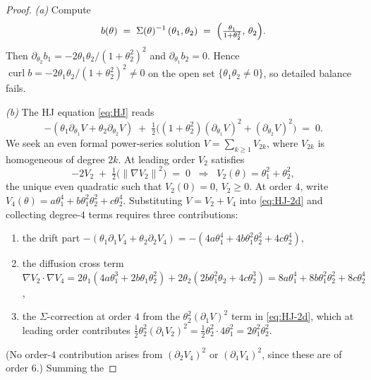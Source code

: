 \documentclass[11pt,a4paper]{article}
\theoremstyle{definition}
\theoremstyle{remark}
\DeclareMathOperator{\curl}{curl}
\newcommand{\norm}[1]{\left\|#1\right\|}
\begin{document}
\begin{proof}
   \emph{(a)}  Compute
   \[
      b(\theta) \;=\; \Sigma(\theta)^{-1}\,(\theta_1,\theta_2)
                  \;=\; \Bigl(\tfrac{\theta_1}{1+\theta_2^2},\,\theta_2\Bigr).
   \]
   Then $\partial_{\theta_2} b_1 = -2\theta_1\theta_2/(1+\theta_2^2)^2$
   and $\partial_{\theta_1} b_2 = 0$.  Hence
   $\curl b = -2\theta_1\theta_2/(1+\theta_2^2)^2 \neq 0$ on the open set
   $\{\theta_1\theta_2\neq 0\}$, so detailed balance fails.

   \emph{(b)} The HJ equation \eqref{eq:HJ} reads
   \begin{equation}\label{eq:HJ-2d}
      -(\theta_1\partial_{\theta_1}V + \theta_2\partial_{\theta_2} V)
      \;+\; \tfrac{1}{2}\bigl((1+\theta_2^2)(\partial_{\theta_1}V)^2
                              + (\partial_{\theta_2}V)^2\bigr)
      \;=\; 0.
   \end{equation}
   We seek an even formal power-series solution
   $V = \sum_{k\geq 1} V_{2k}$, where $V_{2k}$ is homogeneous of degree
   $2k$.  At leading order $V_2$ satisfies
   \[
      -2 V_2 \;+\; \tfrac{1}{2}\bigl(\norm{\nabla V_2}^2\bigr) \;=\; 0
      \;\;\Rightarrow\;\; V_2(\theta) = \theta_1^2 + \theta_2^2,
   \]
   the unique even quadratic such that $V_2(0)=0$, $V_2\geq 0$.  At order
   $4$, write $V_4(\theta) = a\theta_1^4 + b\theta_1^2\theta_2^2
   + c\theta_2^4$.  Substituting $V = V_2 + V_4$ into \eqref{eq:HJ-2d}
   and collecting degree-$4$ terms requires three contributions:
   \begin{enumerate}[label=(\roman*),leftmargin=2.4em]
   \item the drift part
       $-(\theta_1\partial_1 V_4 + \theta_2\partial_2 V_4)
         = -(4a\theta_1^4 + 4b\theta_1^2\theta_2^2 + 4c\theta_2^4)$,
   \item the diffusion cross term
       $\nabla V_2\cdot\nabla V_4
         = 2\theta_1(4a\theta_1^3 + 2b\theta_1\theta_2^2)
         + 2\theta_2(2b\theta_1^2\theta_2 + 4c\theta_2^3)
         = 8a\theta_1^4 + 8b\theta_1^2\theta_2^2 + 8c\theta_2^4$,
   \item the $\Sigma$-correction at order $4$ from the
       $\theta_2^2(\partial_1 V)^2$ term in \eqref{eq:HJ-2d}, which at
       leading order contributes
       $\tfrac{1}{2}\theta_2^2(\partial_1 V_2)^2
        = \tfrac{1}{2}\theta_2^2\cdot 4\theta_1^2 = 2\theta_1^2\theta_2^2$.
   \end{enumerate}
   (No order-$4$ contribution arises from $(\partial_2 V_4)^2$ or
   $(\partial_1 V_4)^2$, since these are of order $6$.)  Summing the

\end{proof}
\end{document}
